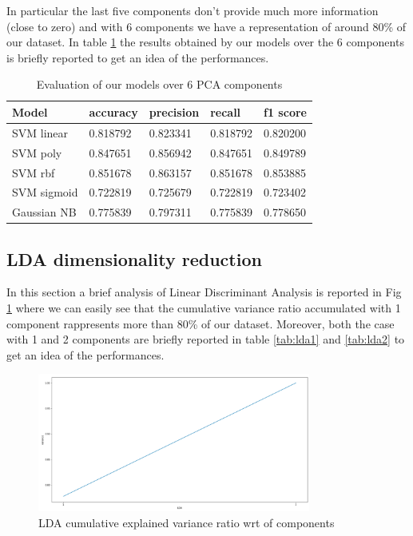 \documentclass[a4paper,12pt]{article}
\begin{document}
\noindent In particular the last five components don't provide much more information (close to zero) and with 6 components we have a representation of around 80\% of our dataset. In table \ref{tab:pca} the results obtained by our models over the 6 components is briefly reported to get an idea of the performances.

\begin{table}[H]
  \begin{tabular}{ |p{6cm}||p{2cm}|p{2cm}|p{2cm}|p{2cm}| }
    \hline
    Model& accuracy & precision  &  recall & f1 score \\
    \hline
    SVM linear           &0.818792&   0.823341&  0.818792&  0.820200\\
    SVM poly             &0.847651&   0.856942&  0.847651&  0.849789\\
    SVM rbf              &0.851678&   0.863157&  0.851678&  0.853885\\
    SVM sigmoid          &0.722819&   0.725679&  0.722819&  0.723402\\
    Gaussian NB          &0.775839&   0.797311&  0.775839&  0.778650\\
    \hline
  \end{tabular}
  \caption{Evaluation of our models over 6 PCA components}
  \label{tab:pca}
  \end{table}

\newpage
\subsection{LDA dimensionality reduction}

In this section a brief analysis of Linear Discriminant Analysis is reported in Fig \ref{fig:lda} where we can easily see that the cumulative variance ratio accumulated with 1 component rappresents more than 80\% of our dataset.
Moreover, both the case with 1 and 2 components are briefly reported in table \ref{tab:lda1} and \ref{tab:lda2} to get an idea of the performances. 

\begin{figure}[H]
  \begin{center}
  \includegraphics[width=0.8\textwidth]{images/lda.png}
  \end{center}
  \caption{LDA cumulative explained variance ratio wrt of components}
  \label{fig:lda}
\end{figure}
\end{document}
